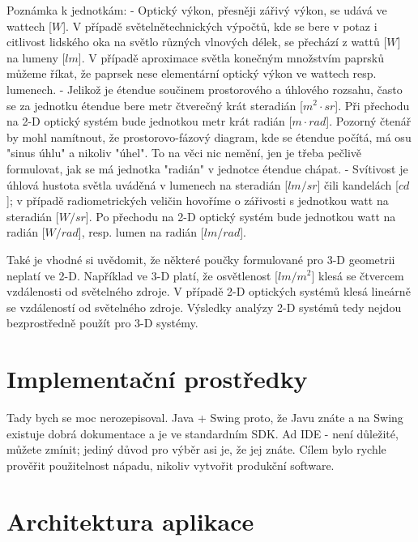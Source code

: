 Poznámka k jednotkám:
- Optický výkon, přesněji zářivý výkon, se udává ve wattech [$W$]. V
případě světelnětechnických výpočtů, kde se bere v potaz i citlivost
lidského oka na světlo různých vlnových délek, se přechází z wattů [$W$]
na lumeny [$lm$]. V případě aproximace světla konečným množstvím paprsků
můžeme říkat, že paprsek nese elementární optický výkon ve wattech resp.
lumenech.
- Jelikož je étendue součinem prostorového a úhlového rozsahu, často se
za jednotku étendue bere metr čtverečný krát steradián [$m^2 \cdot sr$]. Při
přechodu na 2-D optický systém bude jednotkou metr krát radián [$m \cdot rad$].
Pozorný čtenář by mohl namítnout, že prostorovo-fázový diagram,
kde se étendue počítá, má osu "sinus úhlu" a nikoliv "úhel". To na věci
nic nemění, jen je třeba pečlivě formulovat, jak se má jednotka "radián"
v jednotce étendue chápat.
- Svítivost je úhlová hustota světla uváděná v lumenech na steradián
[$lm/sr$] čili kandelách [$cd$]; v případě radiometrických veličin hovoříme
o zářivosti s jednotkou watt na steradián [$W/sr$]. Po přechodu na 2-D
optický systém bude jednotkou watt na radián [$W/rad$], resp. lumen na
radián [$lm/rad$].

Také je vhodné si uvědomit, že některé poučky formulované pro 3-D
geometrii neplatí ve 2-D. Například ve 3-D platí, že osvětlenost
[$lm/m^2$] klesá se čtvercem vzdálenosti od světelného zdroje. V případě
2-D optických systémů klesá lineárně se vzdáleností od světelného
zdroje. Výsledky analýzy 2-D systémů tedy nejdou bezprostředně použít
pro 3-D systémy.



\section{Implementační prostředky}


Tady bych se moc nerozepisoval. Java + Swing proto, že Javu znáte a na
Swing existuje dobrá dokumentace a je ve standardním SDK. Ad IDE - není
důležité, můžete zmínit; jediný důvod pro výběr asi je, že jej znáte.
Cílem bylo rychle prověřit použitelnost nápadu, nikoliv vytvořit
produkční software.



\section{Architektura aplikace}


